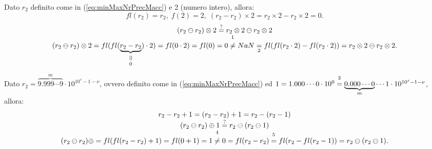 \begin{example}
	Dato $r_2$ definito come in (\ref{eq:minMaxNrPrecMacc}) e 2 (numero intero), allora:
	\begin{equation*}
		fl(r_2)=r_2,\; f(2)=2,\; (r_2-r_2)\times 2= r_2\times 2- r_2\times 2=0. 
	\end{equation*}
	\begin{equation*}
		\begin{matrix}
			(r_2\ominus r_2)\otimes 2 \overset{?}{=}r_2\otimes 2\ominus r_2\otimes 2\\
			(r_2\ominus r_2)\otimes 2 = fl(fl(\equalto{\underbrace{r_2-r_2}}{0})\cdot2)=fl(0\cdot 2)=fl(0)=0\overset{\footnotemark}{\neq} NaN \underset{\footnotemark}{=}fl(fl(r_2\cdot 2)-fl({r_2\cdot 2}))= r_2\otimes 2\ominus r_2\otimes 2.
		\end{matrix}
	\end{equation*}
	
	\addtocounter{footnote}{-1}
	
	
\end{example}
\begin{example}
	Dato $r_2=\overbrace{9.999\cdots 9}^{m}\cdot 10^{10^s-1-\nu}$, ovvero definito come in (\ref{eq:minMaxNrPrecMacc}) ed $1=1.000\cdots 0\cdot 10^0\overset{\footnotemark}{=}\underbrace{0.000\cdots 0}_{m}\cdots 1\cdot 10^{10^s-1-\nu}$,  allora:
	\begin{equation*}
		\begin{matrix}
			r_2-r_2+1=(r_2-r_2)+1=r_2-(r_2-1)\\
			(r_2\ominus r_2)\oplus 1 \overset{?}{=} r_2\ominus(r_2\ominus1)\\
			(r_2\ominus r_2)\oplus=fl(fl(r_2-r_2)+1)=fl(0+1)=1\overset{\footnotemark}{\neq} 0=fl(r_2-r_2)\overset{\footnotemark}{=}fl(r_2-fl(r_2-1))=r_2\ominus(r_2\ominus 1).
		\end{matrix}
	\end{equation*}
	\addtocounter{footnote}{-1}
	
\end{example}

